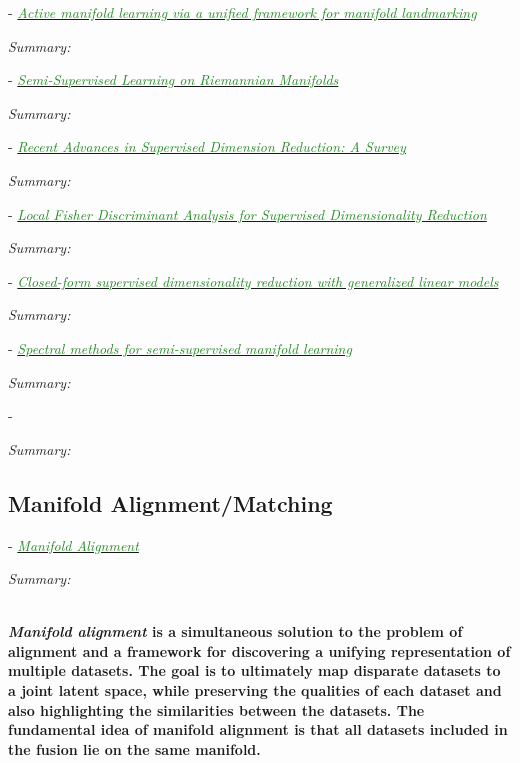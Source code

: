 \documentclass[]{article}
\newcommand{\paperentry}[4]{
            \hangindent=1cm
            \cite{#1} - \href{run:../References/#3}{\textcolor{ForestGreen}{\textit{#2}}}
            
            \noindent            
            \begin{minipage}[t]{0.1\linewidth}\hfill\end{minipage}
            \begin{minipage}[t]{0.8\linewidth}\textcolor{NavyBlue}{{\textit{Summary:}}}#4\end{minipage}
            \vspace{.25cm}
          }
\begin{document}
	\paperentry{Xu2017ActiveManifoldLearning}
	{Active manifold learning via a unified framework for manifold landmarking}
	{Manifold_Representation_Learning/Supervised/Xu2017ActiveManifoldLearning.pdf}
	{}
	
	\paperentry{Belkin2004SemiSupLearningRiemannianManifolds}
	{Semi-Supervised Learning on Riemannian Manifolds}
	{Manifold_Representation_Learning/Supervised/Belkin2004SemiSupLearningRiemannianManifolds.pdf}
	{}
	
	\paperentry{Chao2019RecentAdvancesSupervisedDimRed}
	{Recent Advances in Supervised Dimension Reduction: A Survey}
	{Manifold_Representation_Learning/Supervised/Chao2019RecentAdvancesSupervisedDimRed.pdf}
	{}
	
	\paperentry{Sugiyama2006FDASupDimRed}
	{Local Fisher Discriminant Analysis for Supervised Dimensionality Reduction}
	{Manifold_Representation_Learning/Supervised/Sugiyama2006FDASupDimRed.pdf}
	{}
	
	\paperentry{Rish2008SupDimRedGLM}
	{Closed-form supervised dimensionality reduction with generalized linear models}
	{Manifold_Representation_Learning/Supervised/Rish2008SupDimRedGLM.pdf}
	{}
	
	\paperentry{Zhang2008SpectralSemiSupManifoldLearning}
	{Spectral methods for semi-supervised manifold learning}
	{Manifold_Representation_Learning/Supervised/Zhang2008SpectralSemiSupManifoldLearning.pdf}
	{}
	
	\paperentry{}
	{}
	{Manifold_Representation_Learning/Supervised/.pdf}
	{}
	
	
	\subsection{Manifold Alignment/Matching}
	
		\paperentry{Wang2011ManifoldAlignment}
		{Manifold Alignment}
		{Manifold_Representation_Learning/Alignment/Wang2011ManifoldAlignment.pdf}
		{} \\ \textbf{\textit{Manifold alignment} is a simultaneous solution to the problem of alignment and a framework for discovering a unifying representation of multiple datasets.  The goal is  to ultimately map disparate datasets to a joint latent space, while preserving the qualities of each dataset and also highlighting the similarities between the datasets. The fundamental idea of manifold alignment is that all datasets included in the fusion lie on the same manifold.} \\ \\
			
\end{document}
